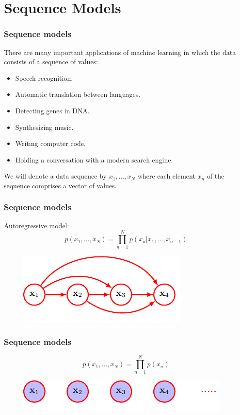 \documentclass{beamer}
\begin{document}
\section{Sequence Models}

\begin{frame}
    \frametitle{Sequence models}
    There are many important applications of machine learning in which the data consists of a sequence of values:
    \begin{itemize}
        \item Speech recognition.
        \item Automatic translation between languages.
        \item Detecting genes in DNA.
        \item Synthesizing music.
        \item Writing computer code.
        \item Holding a conversation with a modern search engine.
    \end{itemize}
    We will denote a data sequence by $x_{1},\hdots,x_{N}$ where each element $x_{n}$ of the sequence comprises a vector of values.
\end{frame}

\begin{frame}
    \frametitle{Sequence models}
    Autoregressive model:
    \begin{equation*}
        p(x_{1},\hdots,x_{N})=\prod_{n=1}^{N}p(x_{n}|x_{1},\hdots,x_{n-1})
    \end{equation*}
    \begin{figure}
        \includegraphics{Figure_27.pdf}
    \end{figure}
\end{frame}

\begin{frame}
    \frametitle{Sequence models}
    \begin{equation*}
        p(x_{1},\hdots,x_{N})=\prod_{n=1}^{N}p(x_{n})
    \end{equation*}
    \begin{figure}
        \includegraphics{Figure_28.pdf}
    \end{figure}
\end{frame}
\end{document}
